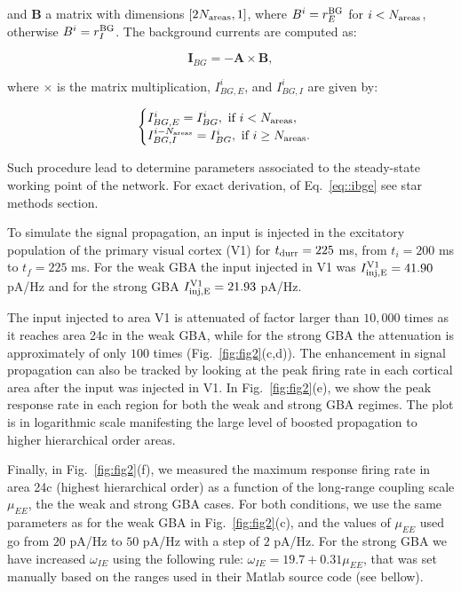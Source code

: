 \noindent and $\pmb B$ a matrix with dimensions $[2N_{\rm areas}, 1]$, where $B^{i} = r_{E}^{\rm BG}$ for $i < N_{\rm areas}$, otherwise $B^{i} = r_{I}^{\rm BG}$. The background currents are computed as:

\begin{equation}
    \pmb I_{BG} = -\pmb A \times \pmb B,
\end{equation}

\noindent where $\times$ is the matrix multiplication, $I_{BG,E}^{i}$, and $I_{BG,I}^{i}$ are given by:

\begin{equation}
\begin{cases}
I_{BG,E}^{i}  = I_{BG}^{i}, \text{ if } i < N_{\rm areas},\\
I_{BG,I}^{i-N_{\rm areas}}  = I_{BG}^{i}, \text{ if } i \geq N_{\rm areas}.
\end{cases}
\label{eq::ibge}
\end{equation}

Such procedure lead to determine parameters associated to the steady-state working point of the network. For exact derivation, of Eq.~\ref{eq::ibge} see \cite{joglekar2018inter} star methods section.


To simulate the signal propagation, an input is injected in the excitatory population of the primary visual cortex (V1) for $t_{\rm durr} = 225$ ms, from $t_{i} = 200$ ms to $t_{f} = 225$ ms. For the weak GBA the input injected in V1 was $I_{\rm inj, E}^{\rm V1} = 41.90$ pA/Hz and for the strong GBA  $I_{\rm inj, E}^{\rm V1} = 21.93$ pA/Hz.

The input injected to area V1 is attenuated of factor larger than $10,000$ times as it reaches area 24c in the weak GBA, while for the strong GBA the attenuation is approximately of only $100$ times (Fig.~\ref{fig:fig2}(c,d)). The enhancement in signal propagation can also be tracked by looking at the peak firing rate in each cortical area after the input was injected in V1. In Fig.~\ref{fig:fig2}(e), we show the peak response rate in each region for both the weak and strong GBA regimes. The plot is in logarithmic scale manifesting the large level of boosted propagation to higher hierarchical order areas.

Finally, in Fig.~\ref{fig:fig2}(f), we measured the maximum response firing rate in area 24c (highest hierarchical order) as a function of the long-range coupling scale $\mu_{EE}$, the the weak and strong GBA cases. For both conditions, we use the same parameters as for the weak GBA in Fig.~\ref{fig:fig2}(c), and the values of $\mu_{EE}$ used go from $20$ pA/Hz to $50$ pA/Hz with a step of $2$ pA/Hz. For the strong GBA we have increased $\omega_{IE}$ using the following rule: $\omega_{IE} = 19.7 + 0.31\mu_{EE}$, that was set manually based on the ranges used in their Matlab source code (see bellow).

